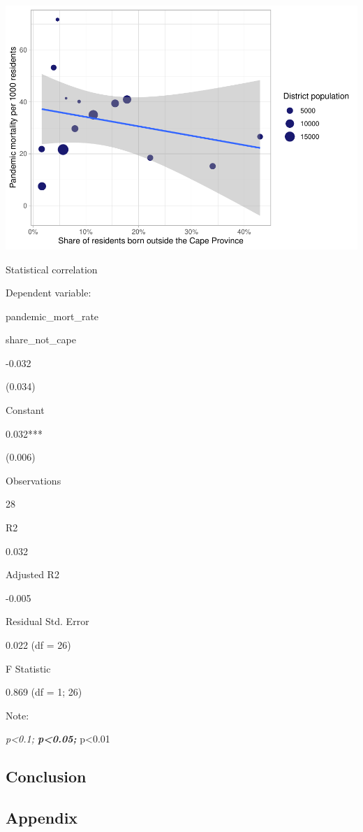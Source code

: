 \documentclass[fleqn,10pt,lineno]{wlpeerj} %
\begin{document}
\includegraphics{spanish-flu-mortality_bookdown_files/figure-latex/unnamed-chunk-24-1.pdf}

Statistical correlation

Dependent variable:

pandemic\_mort\_rate

share\_not\_cape

-0.032

(0.034)

Constant

0.032***

(0.006)

Observations

28

R2

0.032

Adjusted R2

-0.005

Residual Std. Error

0.022 (df = 26)

F Statistic

0.869 (df = 1; 26)

Note:

\emph{p\textless0.1; \textbf{p\textless0.05; }}p\textless0.01

\hypertarget{conclusion}{%
\subsection{Conclusion}\label{conclusion}}

\hypertarget{appendix}{%
\subsection{Appendix}\label{appendix}}
\end{document}
